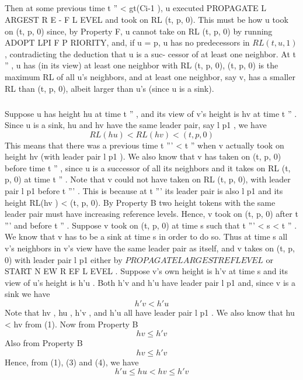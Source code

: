 \subparagraph{}Then at some previous time t '' < gt(Ci-1 ), u executed PROPAGATE L ARGEST R E - F L EVEL and took on RL (t, p, 0). This must be how u took on (t, p, 0) since, by Property F, u cannot take on RL (t, p, 0) by running ADOPT LPI F P RIORITY, and, if u = p, u has no predecessors in $RL (t, u, 1)$, contradicting the deduction that u is a suc- cessor of at least one neighbor. At t '' , u has (in its view) at least one neighbor with RL (t, p, 0), (t, p, 0) is the maximum RL of all u's neighbors, and at least one neighbor, say v, has a smaller RL than (t, p, 0), albeit larger than u's (since u is a sink).
\subparagraph{}Suppose u has height hu at time t '' , and its view of v's height is hv at time t '' . Since u is a sink, hu and hv have the same leader pair, say l p1 , we have
\begin{equation}
RL(hu ) < RL(hv ) < (t, p, 0)
\end{equation}
This means that there was a previous time t ''' < t '' when v actually took on height hv (with leader pair l p1 ). We also know that v has taken on (t, p, 0) before time t '' , since u is a successor of all its neighbors and it takes on RL (t, p, 0) at time t '' . Note that v could not have taken on RL (t, p, 0), with leader pair l p1 before t ''' . This is because at t ''' its leader pair is also l p1 and its height RL(hv ) < (t, p, 0). By Property B two height tokens with the same leader pair must have increasing reference levels. Hence, v took on (t, p, 0) after t ''' and before t '' . Suppose v took on (t, p, 0) at time s such that t ''' < s < t '' . We know that v has to be a sink at time s in order to do so. Thus at time s all v's neighbors in v's view have the same leader pair as itself, and v takes on (t, p, 0) with leader pair l p1 either by $PROPAGATELARGESTREFLEVEL$ or START N EW R EF L EVEL . Suppose v's own height is h'v at time s and its view of u's height is h'u . Both h'v and h'u have leader pair l p1 and, since v is a sink we have
\begin{equation}
h'v < h'u
\end{equation}
Note that hv , hu , h'v , and h'u all have leader pair l p1 . We also know that hu < hv from (1). Now from Property B
\begin{equation}
hv \leq h'v
\end{equation}
Also from Property B
\begin{equation}
hv \leq h'v
\end{equation}
Hence, from (1), (3) and (4), we have
\begin{equation}
h'u \leq hu < hv \leq h'v
\end{equation}
